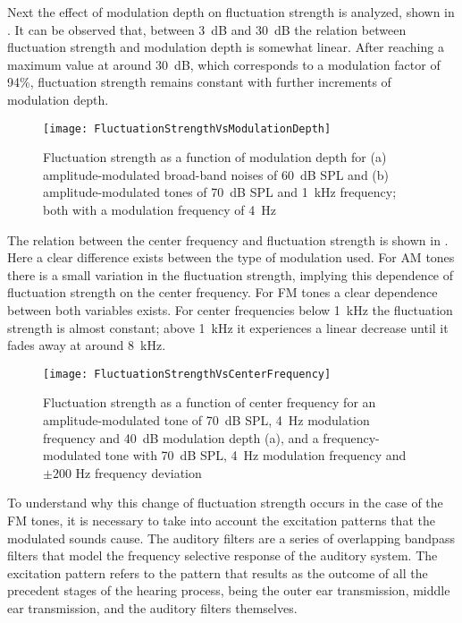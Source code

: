 \documentclass[../main.tex]{subfiles}
\begin{document}
\begin{theoreticalbackground}
Next the effect of modulation depth on fluctuation strength is analyzed, shown
in . It can be observed that, between 3~dB and 30~dB
the relation between fluctuation strength and modulation depth is somewhat
linear. After reaching a maximum value at around 30~dB, which corresponds to a
modulation factor of 94\%, fluctuation strength remains constant with further
increments of modulation depth.

\begin{figure}[!ht]
  \centering
  \texttt{[image: FluctuationStrengthVsModulationDepth]}
  \caption{Fluctuation strength as a function of modulation depth for (a)
    amplitude-modulated broad-band noises of 60~dB SPL and (b)
    amplitude-modulated tones of 70~dB SPL and 1~kHz frequency; both with a
    modulation frequency of 4~Hz~\cite[pp.~249]{Fastl2007Psychoacoustics}}
\label{fig:flucstrenvsmoddep}
\end{figure}

The relation between the center frequency and fluctuation strength is shown in
. Here a clear difference exists between the type of
modulation used. For \gls{AM} tones there is a small variation in the
fluctuation strength, implying this dependence of fluctuation strength on the
center frequency. For \gls{FM} tones a clear dependence between
both variables exists. For center frequencies below 1~kHz the fluctuation
strength is almost constant; above 1~kHz it experiences a linear decrease until
it fades away at around 8~kHz.

\begin{figure}[!ht]
  \centering
  \texttt{[image: FluctuationStrengthVsCenterFrequency]}
  \caption{Fluctuation strength as a function of center frequency for an
    amplitude-modulated tone of 70~dB SPL, 4~Hz modulation frequency and 40~dB
    modulation depth (a), and a frequency-modulated tone with 70~dB SPL, 4~Hz
    modulation frequency and $\pm200$ Hz frequency
    deviation~\cite[pp. 250]{Fastl2007Psychoacoustics}}
\label{fig:flucstrenvscfreq}
\end{figure}

To understand why this change of fluctuation strength occurs in the case of the
\gls{FM} tones, it is necessary to take into account the excitation patterns
that the modulated sounds cause. The auditory filters are a series of
overlapping bandpass filters that model the frequency selective response of the
auditory system. The excitation pattern refers to the pattern that results as
the outcome of all the precedent stages of the hearing process, being the outer
ear transmission, middle ear transmission, and the auditory filters themselves.


\end{theoreticalbackground}
\end{document}
